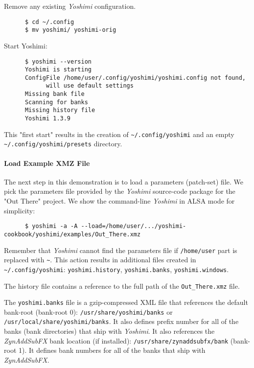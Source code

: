    Remove any existing \textsl{Yoshimi} configuration.

   \begin{verbatim}
      $ cd ~/.config
      $ mv yoshimi/ yoshimi-orig
   \end{verbatim}

   Start Yoshimi:

   \begin{verbatim}
      $ yoshimi --version
      Yoshimi is starting
      ConfigFile /home/user/.config/yoshimi/yoshimi.config not found,
            will use default settings
      Missing bank file
      Scanning for banks
      Missing history file
      Yoshimi 1.3.9
   \end{verbatim}

   This "first start" results in the creation of 
   \texttt{\textasciitilde/.config/yoshimi} and
   an empty \texttt{\textasciitilde/.config/yoshimi/presets} directory.

\paragraph{Load Example XMZ File}
\label{paragraph:yoshimi_load_xmz_file}

   The next step in this demonstration is to load a parameters (patch-set)
   file.  We pick the parameters file provided by the \textsl{Yoshimi}
   source-code package for the "Out There" project.  We show the command-line
   \textsl{Yoshimi} in ALSA mode for simplicity:

   \begin{verbatim}
      $ yoshimi -a -A --load=/home/user/.../yoshimi-cookbook/yoshimi/examples/Out_There.xmz
   \end{verbatim}

   Remember that \textsl{Yoshimi} cannot find the parameters file if
   \texttt{/home/user} part is replaced with \texttt{\textasciitilde}.
	This action results in additional files created in
   \texttt{\textasciitilde/.config/yoshimi}:
      \texttt{yoshimi.history},
      \texttt{yoshimi.banks},
      \texttt{yoshimi.windows}.

   The history file contains a reference to the full path of the
   \texttt{Out\_There.xmz} file.

   The \texttt{yoshimi.banks} file is a gzip-compressed XML file that
   references the default bank-root (bank-root 0):
   \texttt{/usr/share/yoshimi/banks} or
   \texttt{/usr/local/share/yoshimi/banks}.
   It also defines
   prefix number for all of the banks (bank directories) that ship with
   \textsl{Yoshimi}.  It also references the
   \textsl{ZynAddSubFX} bank location (if installed):
   \texttt{/usr/share/zynaddsubfx/bank} (bank-root 1).
   It defines bank numbers for all of
   the banks that ship with \textsl{ZynAddSubFX}.

